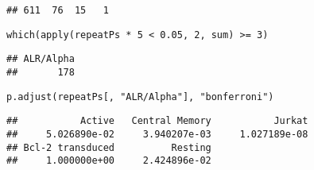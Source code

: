 \documentclass[../../sherrill-Mix_thesis.tex]{subfiles}
\makeatletter
\newenvironment{kframe}{%
 \def\at@end@of@kframe{}%
 \ifinner\ifhmode%
  \def\at@end@of@kframe{\end{minipage}}%
  \begin{minipage}{\columnwidth}%
 \fi\fi%
 \def\FrameCommand##1{\hskip\@totalleftmargin \hskip-\fboxsep
 \colorbox{shadecolor}{##1}\hskip-\fboxsep
     \hskip-\linewidth \hskip-\@totalleftmargin \hskip\columnwidth}%
 \MakeFramed {\advance\hsize-\width
   \@totalleftmargin\z@ \linewidth\hsize
   \@setminipage}}%
 {\par\unskip\endMakeFramed%
 \at@end@of@kframe}
\newenvironment{knitrout}{}{} %
\makeatother
\begin{document}
\begin{knitrout}
\begin{kframe}
\begin{lstlisting}[basicstyle=\ttfamily,breaklines=true]
## 611  76  15   1
\end{lstlisting}
\begin{lstlisting}[basicstyle=\ttfamily,breaklines=true]
which(apply(repeatPs * 5 < 0.05, 2, sum) >= 3)\end{lstlisting}
\begin{lstlisting}[basicstyle=\ttfamily,breaklines=true]
## ALR/Alpha 
##       178
\end{lstlisting}
\begin{lstlisting}[basicstyle=\ttfamily,breaklines=true]
p.adjust(repeatPs[, "ALR/Alpha"], "bonferroni")\end{lstlisting}
\begin{lstlisting}[basicstyle=\ttfamily,breaklines=true]
##           Active   Central Memory           Jurkat 
##     5.026890e-02     3.940207e-03     1.027189e-08 
## Bcl-2 transduced          Resting 
##     1.000000e+00     2.424896e-02
\end{lstlisting}
\end{kframe}
\end{knitrout}
\end{document}
